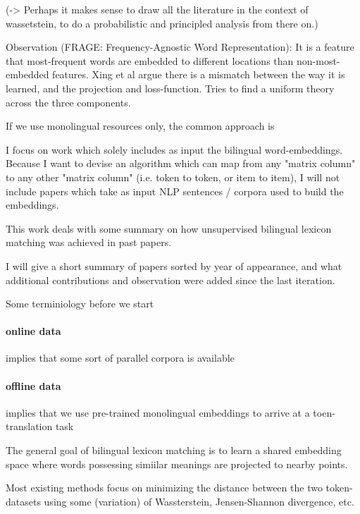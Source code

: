 \documentclass[a4paper,12pt,twoside,openright]{report}
\begin{document}
(-> Perhaps it makes sense to draw all the literature in the context of wassetstein, to do a probabilistic and principled analysis from there on.)








Observation (FRAGE: Frequency-Agnostic Word Representation): It is a feature that most-frequent words are embedded to different locations than non-most-embedded features.
Xing et al argue there is a mismatch between the way it is learned, and the projection and loss-function.
Tries to find a uniform theory across the three components.






If we use monolingual resources only, the common approach is

I focus on work which solely includes as input the bilingual word-embeddings.
Because I want to devise an algorithm which can map from any "matrix column" to any other "matrix column" (i.e. token to token, or item to item), I will not include papers which take as input NLP sentences / corpora used to build the embeddings. 

This work deals with some summary on how unsupervised bilingual lexicon matching was achieved in past papers.

I will give a short summary of papers sorted by year of appearance, and what additional contributions and observation were added since the last iteration.

Some terminiology before we start

\paragraph{online data} implies that some sort of parallel corpora is available
\paragraph{offline data} implies that we use pre-trained monolingual embeddings to arrive at a toen-translation task

The general goal of bilingual lexicon matching is to learn a shared embedding space where words possessing simiilar meanings are projected to nearby points.

Most existing methods focus on minimizing the distance between the two token-datasets using some (variation) of Wassterstein, Jensen-Shannon divergence, etc.
\end{document}
